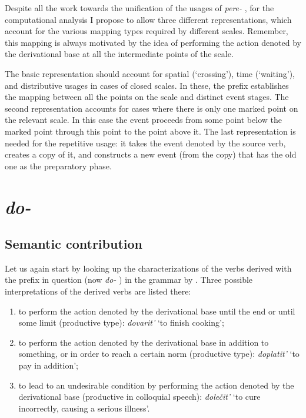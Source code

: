 Despite all the work towards the unification of the usages of \textit{pere-}  , for the computational analysis I propose to allow three different representations, which account for the various mapping types required by different scales. Remember, this mapping is always motivated by the idea of performing the action denoted by the derivational base at all the intermediate points of the scale. 

The basic representation should account for spatial  (`crossing'), time (`waiting'), and distributive  usages in cases of closed scales. In these, the prefix establishes the mapping between all the points on the scale and distinct event stages. The second representation accounts for cases where there is only one marked point on the relevant scale. In this case the event proceeds from some point below the marked point through this point to the point above it. The last representation is needed for the repetitive  usage: it takes the event denoted by the source verb, creates a copy of it, and constructs a new event (from the copy) that has the old one as the preparatory phase.

\section{\textit{do-}  }\label{subsection:semantics:do}
\subsection{Semantic contribution}
Let us again start by looking up the characterizations of the verbs derived with the prefix in question (now \textit{do-}  ) in the grammar by \citet[357--358]{Shvedova:82}. Three possible interpretations of the derived verbs are listed there:
\begin{enumerate}
\item to perform the action denoted by the derivational base until the end or until some limit (productive type): \textit{dovarit'} `to finish cooking';
\item to perform the action denoted by the derivational base in addition to something, or in order to reach a certain norm (productive type): \textit{doplatit'} `to pay in addition';
\item to lead to an undesirable condition by performing the action denoted by the derivational base (productive in colloquial speech): \textit{dole\v{c}it'} `to cure incorrectly, causing a serious illness'.
\end{enumerate}

